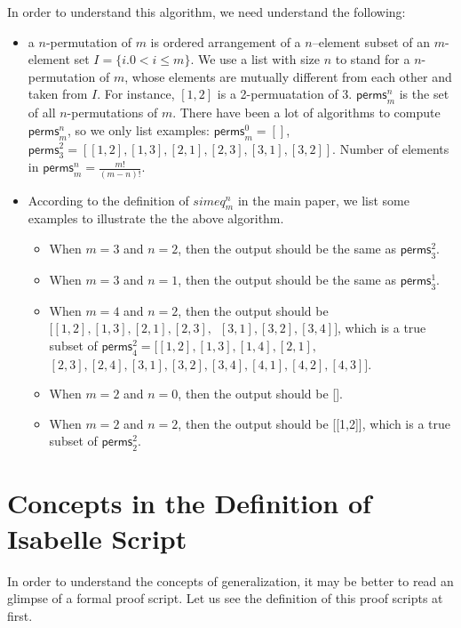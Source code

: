 \documentclass{llncs}
\begin{document}
In order to understand this algorithm, we need understand the following:
\begin{itemize}
\item a $n$-permutation of $m$ is ordered arrangement of a $n$--element subset of an $m$-element set $I=\{i. 0<i\le m\}$. We use a list with size $n$ to stand for a $n$-permutation of $m$, whose elements are mutually different from each other and taken from $I$.  For instance, $[1,2]$ is a 2-permuatation of 3.  $\mathsf{perms}_{m}^{n}$ is the set of all $n$-permutations of $m$. There have been a lot of algorithms to compute $\mathsf{perms}_{m}^{n}$, so we only list examples: $\mathsf{perms}_{m}^{0}=[]$, $\mathsf{perms}_{3}^{2}=[[1,2],[1,3],[2,1],[2,3],[3,1],[3,2]]$. Number of elements in $\mathsf{perms}_{m}^{n}=\frac{m!}{(m-n)!}$.

\item  According to the definition of $simeq_m^n$ in the main paper, we list some examples to illustrate the the above algorithm.

\begin{itemize}
\item When $m=3$ and $n=2$, then the output should be the same as  $\mathsf{perms}_{3}^{2}$.

\item  When $m=3$ and $n=1$, then the output should be the same as  $\mathsf{perms}_{3}^{1}$.

\item  When $m=4$ and $n=2$, then the output should be $[[1,2],[1,3],[2,1],[2,3],$\ $[3,1],[3,2],[3,4]]$, which is a true  subset of $\mathsf{perms}_{4}^{2}=[[1,2],[1,3],[1,4],[2,1],$\ $ [2,3],[2,4],[3,1],[3,2],[3,4],[4,1],[4,2],[4,3]]$.

\item When $m=2$ and $n=0$,  then the output should be [].

\item When $m=2$ and $n=2$, then the output should be [[1,2]], which is a true subset of $\mathsf{perms}_{2}^{2}$.
 \end{itemize}


\end{itemize}

\section{Concepts in the Definition of Isabelle Script}
In order to understand the concepts of generalization, it may be better to read an glimpse of a formal proof script.
 Let us see the definition of this proof scripts at first.
\end{document}
